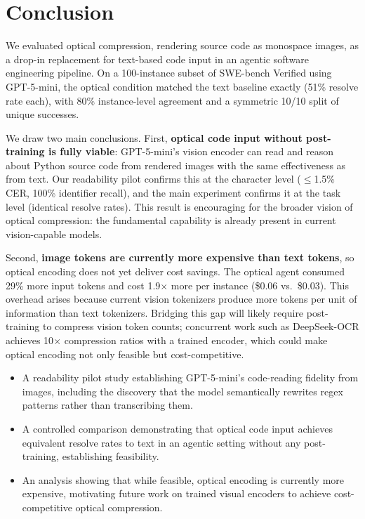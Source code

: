 \section{Conclusion}

We evaluated optical compression, rendering source code as monospace images, as a drop-in replacement for text-based code input in an agentic software engineering pipeline. On a 100-instance subset of SWE-bench Verified using GPT-5-mini, the optical condition matched the text baseline exactly (51\% resolve rate each), with 80\% instance-level agreement and a symmetric 10/10 split of unique successes.

We draw two main conclusions. First, \textbf{optical code input without post-training is fully viable}: GPT-5-mini's vision encoder can read and reason about Python source code from rendered images with the same effectiveness as from text. Our readability pilot confirms this at the character level ($\le$1.5\% CER, 100\% identifier recall), and the main experiment confirms it at the task level (identical resolve rates). This result is encouraging for the broader vision of optical compression: the fundamental capability is already present in current vision-capable models.

Second, \textbf{image tokens are currently more expensive than text tokens}, so optical encoding does not yet deliver cost savings. The optical agent consumed 29\% more input tokens and cost 1.9$\times$ more per instance (\$0.06 vs.\ \$0.03). This overhead arises because current vision tokenizers produce more tokens per unit of information than text tokenizers. Bridging this gap will likely require post-training to compress vision token counts; concurrent work such as DeepSeek-OCR \cite{wei2025deepseekocr} achieves 10$\times$ compression ratios with a trained encoder, which could make optical encoding not only feasible but cost-competitive.

\begin{itemize}[leftmargin=*]
  \item A readability pilot study establishing GPT-5-mini's code-reading fidelity from images, including the discovery that the model semantically rewrites regex patterns rather than transcribing them.
  \item A controlled comparison demonstrating that optical code input achieves equivalent resolve rates to text in an agentic setting without any post-training, establishing feasibility.
  \item An analysis showing that while feasible, optical encoding is currently more expensive, motivating future work on trained visual encoders to achieve cost-competitive optical compression.
\end{itemize}

